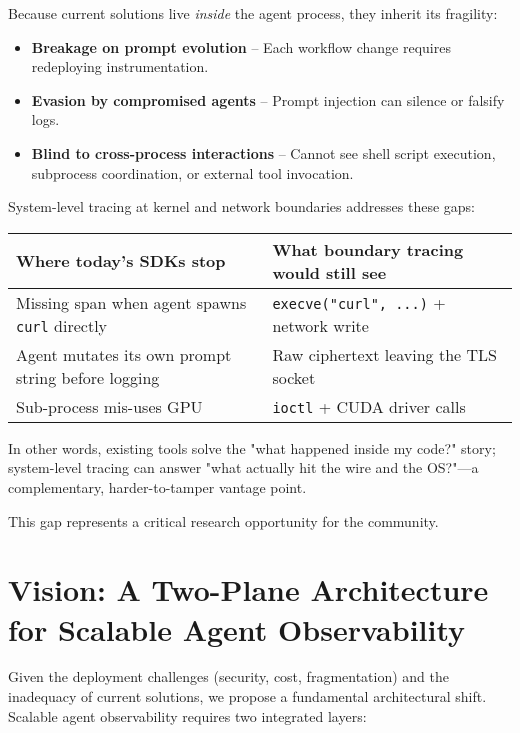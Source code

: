 \documentclass[sigplan,screen，review,9pt]{acmart}
\begin{document}
Because current solutions live \emph{inside} the agent process, they inherit its fragility:

\begin{itemize}
  \item \textbf{Breakage on prompt evolution} – Each workflow change requires redeploying instrumentation.
  \item \textbf{Evasion by compromised agents} – Prompt injection can silence or falsify logs.
  \item \textbf{Blind to cross-process interactions} – Cannot see shell script execution, subprocess coordination, or external tool invocation.
\end{itemize}

System-level tracing at kernel and network boundaries addresses these gaps:

\begin{table}[h]
\centering
\small
\begin{tabular}{p{} p{}}
\toprule
\textbf{Where today's SDKs stop} & \textbf{What boundary tracing would still see} \\
\midrule
Missing span when agent spawns \texttt{curl} directly & \texttt{execve("curl", ...)} + network write \\
Agent mutates its own prompt string before logging & Raw ciphertext leaving the TLS socket \\
Sub-process mis-uses GPU & \texttt{ioctl} + CUDA driver calls \\
\bottomrule
\end{tabular}
\end{table}

In other words, existing tools solve the "what happened inside my code?" story; system-level tracing can answer "what actually hit the wire and the OS?"—a complementary, harder-to-tamper vantage point.

This gap represents a critical research opportunity for the community.

\section{Vision: A Two-Plane Architecture for Scalable Agent Observability}

Given the deployment challenges (security, cost, fragmentation) and the inadequacy of current solutions, we propose a fundamental architectural shift. Scalable agent observability requires two integrated layers:
\end{document}
